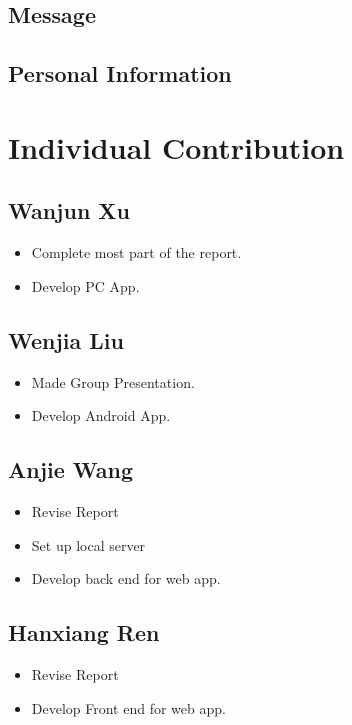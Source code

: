 \documentclass{article}
\begin{document}
\subsection{Message} 	


\subsection{Personal Information}

\section{Individual Contribution}
\subsection{Wanjun Xu}
\begin{itemize}
	\item Complete most part of the report.
	\item Develop PC App.
\end{itemize}

\subsection{Wenjia Liu}
\begin{itemize}
	\item Made Group Presentation.
	\item Develop Android App.
\end{itemize}

\subsection{Anjie Wang}
\begin{itemize}
	\item Revise Report
	\item Set up local server 
	\item Develop back end for web app.
\end{itemize}

\subsection{Hanxiang Ren}
\begin{itemize}
	\item Revise Report
	\item Develop Front end for web app.
\end{itemize}
\end{document}
